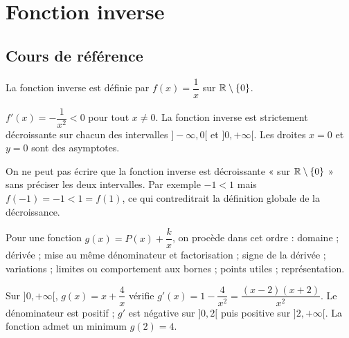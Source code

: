
\chapter{Fonction inverse}
\section{Cours de référence}
La fonction inverse est définie par $f(x)=\dfrac1x$ sur $\mathbb{R}\setminus\{0\}$.

\begin{center}
\end{center}

\begin{retenir}
$f'(x)=-\dfrac1{x^2}<0$ pour tout $x\neq0$. La fonction inverse est strictement décroissante sur chacun des intervalles $]-\infty,0[$ et $]0,+\infty[$. Les droites $x=0$ et $y=0$ sont des asymptotes.
\end{retenir}

\begin{erreur}
On ne peut pas écrire que la fonction inverse est décroissante « sur $\mathbb{R}\setminus\{0\}$ » sans préciser les deux intervalles. Par exemple $-1<1$ mais $f(-1)=-1<1=f(1)$, ce qui contreditrait la définition globale de la décroissance.
\end{erreur}

Pour une fonction $g(x)=P(x)+\dfrac{k}{x}$, on procède dans cet ordre : domaine ; dérivée ; mise au même dénominateur et factorisation ; signe de la dérivée ; variations ; limites ou comportement aux bornes ; points utiles ; représentation.

\begin{exemple}
Sur $]0,+\infty[$, $g(x)=x+\dfrac4x$ vérifie $g'(x)=1-\dfrac4{x^2}=\dfrac{(x-2)(x+2)}{x^2}$. Le dénominateur est positif ; $g'$ est négative sur $]0,2[$ puis positive sur $]2,+\infty[$. La fonction admet un minimum $g(2)=4$.
\end{exemple}

